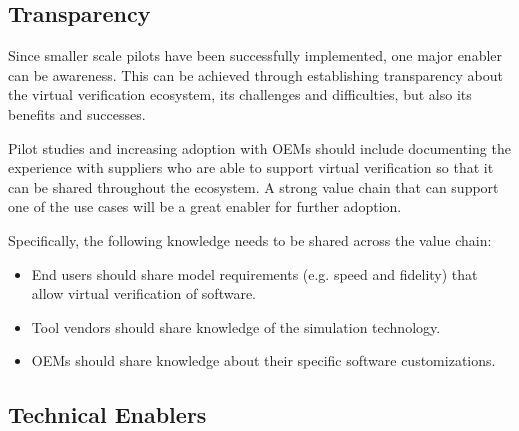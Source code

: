 
\subsection{Transparency}
Since smaller scale pilots have been successfully implemented, one major enabler can be awareness. This can be achieved through establishing transparency about the virtual verification ecosystem, its challenges and difficulties, but also its benefits and successes. 

Pilot studies and increasing adoption with OEMs should include documenting the experience with suppliers who are able to support virtual verification so that it can be shared throughout the ecosystem. A strong value chain that can support one of the use cases will be a great enabler for further adoption.

Specifically, the following knowledge needs to be shared across the value chain:
\begin{itemize}
  \item End users should share model requirements (e.g. speed and fidelity) that allow virtual verification of software.
  \item Tool vendors should share knowledge of the simulation technology.
  \item OEMs should share knowledge about their specific software customizations.
\end{itemize}




\subsection{Technical Enablers}
